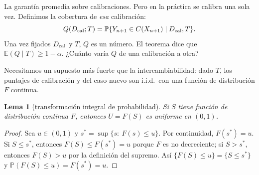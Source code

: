 \documentclass[11pt]{article}
\theoremstyle{plain}
\newtheorem{lema}[teorema]{Lema}
\theoremstyle{definition}
\theoremstyle{remark}
\newcommand{\Prob}{\mathbb P}
\newcommand{\E}{\mathbb E}
\begin{document}
La garantía promedia sobre calibraciones. Pero en la práctica se calibra una sola vez. Definimos la
cobertura de \emph{esa} calibración:
\[
 Q(D_{\rm cal};T)=\Prob\{Y_{n+1}\in C(X_{n+1})\mid D_{\rm cal},T\}.
\]
Una vez fijados $D_{\rm cal}$ y $T$, $Q$ es un número. El teorema dice que $\E(Q\mid T)\ge1-\alpha$.
¿Cuánto varía $Q$ de una calibración a otra?

Necesitamos un supuesto más fuerte que la intercambiabilidad: dado $T$, los puntajes de calibración y
del caso nuevo son i.i.d.\ con una función de distribución $F$ continua.

\begin{lema}[transformación integral de probabilidad]\label{lem:pit}
Si $S$ tiene función de distribución continua $F$, entonces $U=F(S)$ es uniforme en $(0,1)$.
\end{lema}
\begin{proof}
Sea $u\in(0,1)$ y $s^*=\sup\{s:\ F(s)\le u\}$. Por continuidad, $F(s^*)=u$. Si $S\le s^*$, entonces
$F(S)\le F(s^*)=u$ porque $F$ es no decreciente; si $S>s^*$, entonces $F(S)>u$ por la definición del
supremo. Así $\{F(S)\le u\}=\{S\le s^*\}$ y $\Prob(F(S)\le u)=F(s^*)=u$.
\end{proof}
\end{document}
